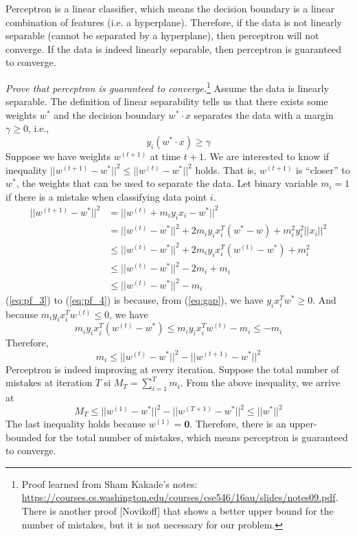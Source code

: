\documentclass[12pt]{article}
\theoremstyle{definition}
\begin{document}
Perceptron is a linear classifier, which means the decision boundary is a linear combination of features (i.e. a hyperplane). Therefore, if the data is not linearly separable (cannot be separated by a hyperplane), then perceptron will not converge. If the data is indeed linearly separable, then perceptron is guaranteed to converge.

\emph{Prove that perceptron is guaranteed to converge.}\footnote{Proof learned from Sham Kakade's notes: \url{https://courses.cs.washington.edu/courses/cse546/16au/slides/notes09.pdf}. There is another proof [Novikoff] that shows a better upper bound for the number of mistakes, but it is not necessary for our problem.} Assume the data is linearly separable. The definition of linear separability tells us that there exists some weights $w^*$ and the decision boundary $w^*\cdot x$ separates the data with a margin $\gamma\geq 0$, i.e.,
\begin{equation}\label{eq:gap}
  y_i(w^*\cdot x)\geq \gamma
\end{equation}
Suppose we have weights $w^{(t+1)}$ at time $t+1$. We are interested to know if inequality $||w^{(t+1)}-w^*||^2\leq||w^{(t)}-w^*||^2$ holds. That is, $w^{(t+1)}$ is ``closer'' to $w^*$, the weights that can be used to separate the data. Let binary variable $m_i=1$ if there is a mistake when classifying data point $i$.
\begin{align}
  ||w^{(t+1)}-w^*||^2&=||w^{(t)}+m_iy_ix_i-w^*||^2\\
  &=||w^{(t)}-w^*||^2+2m_iy_ix_i^T(w^*-w)+m_i^2y_i^2||x_i||^2\\
  \label{eq:pf_3}&\leq ||w^{(t)}-w^*||^2+2m_iy_ix_i^T(w^{(t)}-w^*)+m_i^2\\
  \label{eq:pf_4}&\leq ||w^{(t)}-w^*||^2-2m_i+m_i\\
  &\leq ||w^{(t)}-w^*||^2-m_i
\end{align}
(\ref{eq:pf_3}) to (\ref{eq:pf_4}) is because, from (\ref{eq:gap}), we have $y_ix_i^Tw^*\geq 0$. And because $m_iy_ix_i^Tw^{(t)}\leq 0$, we have
\begin{equation}
  m_iy_ix_i^T(w^{(t)}-w^*)\leq m_iy_ix_i^Tw^{(t)}-m_i\leq -m_i
\end{equation}
Therefore,
\begin{equation}
  m_i\leq||w^{(t)}-w^*||^2-||w^{(t+1)}-w^*||^2
\end{equation}
Perceptron is indeed improving at every iteration. Suppose the total number of mistakes at iteration $T$ si $M_T=\sum_{i=1}^Tm_i$. From the above inequality, we arrive at
\begin{equation}
  M_T\leq||w^{(1)}-w^*||^2-||w^{(T+1)}-w^*||^2\leq ||w^*||^2
\end{equation}
The last inequality holds because $w^{(1)}=\bm{0}$. Therefore, there is an upper-bounded for the total number of mistakes, which means perceptron is guaranteed to converge.
\end{document}
